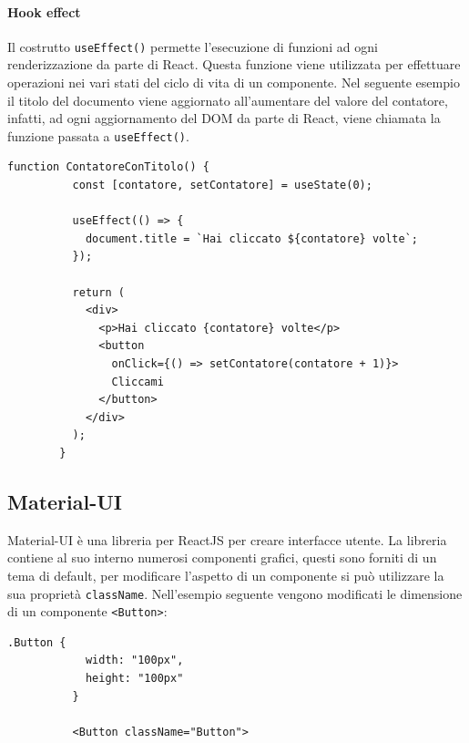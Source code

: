 \documentclass[a4paper]{article}
\begin{document}
      \paragraph{Hook effect}
      Il costrutto \verb|useEffect()| permette l'esecuzione di funzioni ad ogni renderizzazione da parte di React.
      Questa funzione viene utilizzata per effettuare operazioni nei vari stati del ciclo di vita di un componente.
      \newline
      Nel seguente esempio il titolo del documento viene aggiornato all'aumentare del valore del contatore, infatti, 
      ad ogni aggiornamento del DOM da parte di React, viene chiamata la funzione passata a \verb|useEffect()|.
      \begin{lstlisting}[style=ES6, title={Esempio uso di useEffect()}]
        function ContatoreConTitolo() {
          const [contatore, setContatore] = useState(0);

          useEffect(() => {
            document.title = `Hai cliccato ${contatore} volte`;
          });

          return (
            <div>
              <p>Hai cliccato {contatore} volte</p>
              <button
                onClick={() => setContatore(contatore + 1)}>
                Cliccami
              </button>
            </div>
          );
        }\end{lstlisting}

        \subsection{Material-UI}
        Material-UI è una libreria per ReactJS per creare interfacce utente.
        La libreria contiene al suo interno numerosi componenti grafici,
        questi sono forniti di un tema di default, per modificare l'aspetto di
        un componente si può utilizzare la sua proprietà \verb|className|.
        \newline
        Nell'esempio seguente vengono modificati le dimensione di un componente \verb|<Button>|:
        \begin{lstlisting}[style=ES6, title={Esempio modifica aspetto di un componente}]
          .Button {
            width: "100px",
            height: "100px"
          }

          <Button className="Button">
        \end{lstlisting}
\end{document}
